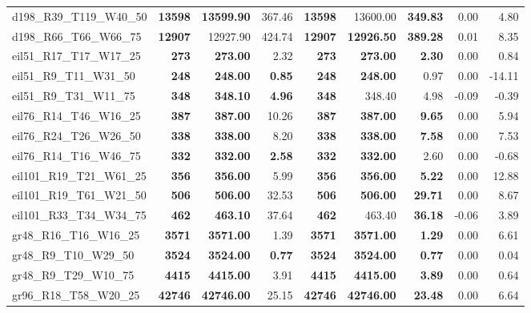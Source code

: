 \documentclass{singlecol-new}
\begin{document}
\begin{scriptsize}
\begin{longtable}{lrrrrrrrr}
		d198\_R39\_T119\_W40\_50 & \textbf{13598} & \textbf{13599.90} & 367.46 & \textbf{13598} & 13600.00 & \textbf{349.83} & 0.00 & 4.80 \\
		d198\_R66\_T66\_W66\_75 & \textbf{12907} & 12927.90 & 424.74 & \textbf{12907} & \textbf{12926.50} & \textbf{389.28} & 0.01 & 8.35 \\
		eil51\_R17\_T17\_W17\_25 & \textbf{273} & \textbf{273.00} & 2.32 & \textbf{273} & \textbf{273.00} & \textbf{2.30} & 0.00 & 0.84 \\
		eil51\_R9\_T11\_W31\_50 & \textbf{248} & \textbf{248.00} & \textbf{0.85} & \textbf{248} & \textbf{248.00} & 0.97 & 0.00 & -14.11 \\
		eil51\_R9\_T31\_W11\_75 & \textbf{348} & \textbf{348.10} & \textbf{4.96} & \textbf{348} & 348.40 & 4.98 & -0.09 & -0.39 \\
		eil76\_R14\_T46\_W16\_25 & \textbf{387} & \textbf{387.00} & 10.26 & \textbf{387} & \textbf{387.00} & \textbf{9.65} & 0.00 & 5.94 \\
		eil76\_R24\_T26\_W26\_50 & \textbf{338} & \textbf{338.00} & 8.20 & \textbf{338} & \textbf{338.00} & \textbf{7.58} & 0.00 & 7.53 \\
		eil76\_R14\_T16\_W46\_75 & \textbf{332} & \textbf{332.00} & \textbf{2.58} & \textbf{332} & \textbf{332.00} & 2.60 & 0.00 & -0.68 \\
		eil101\_R19\_T21\_W61\_25 & \textbf{356} & \textbf{356.00} & 5.99 & \textbf{356} & \textbf{356.00} & \textbf{5.22} & 0.00 & 12.88 \\
		eil101\_R19\_T61\_W21\_50 & \textbf{506} & \textbf{506.00} & 32.53 & \textbf{506} & \textbf{506.00} & \textbf{29.71} & 0.00 & 8.67 \\
		eil101\_R33\_T34\_W34\_75 & \textbf{462} & \textbf{463.10} & 37.64 & \textbf{462} & 463.40 & \textbf{36.18} & -0.06 & 3.89 \\
		gr48\_R16\_T16\_W16\_25 & \textbf{3571} & \textbf{3571.00} & 1.39 & \textbf{3571} & \textbf{3571.00} & \textbf{1.29} & 0.00 & 6.61 \\
		gr48\_R9\_T10\_W29\_50 & \textbf{3524} & \textbf{3524.00} & \textbf{0.77} & \textbf{3524} & \textbf{3524.00} & \textbf{0.77} & 0.00 & 0.04 \\
		gr48\_R9\_T29\_W10\_75 & \textbf{4415} & \textbf{4415.00} & 3.91 & \textbf{4415} & \textbf{4415.00} & \textbf{3.89} & 0.00 & 0.64 \\
		gr96\_R18\_T58\_W20\_25 & \textbf{42746} & \textbf{42746.00} & 25.15 & \textbf{42746} & \textbf{42746.00} & \textbf{23.48} & 0.00 & 6.64 \\

\end{longtable}
\end{scriptsize}
\end{document}
